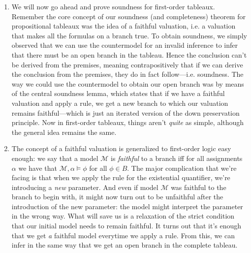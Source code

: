 	\begin{enumerate}[{\thesection}.1]

		\item We will now go ahead and prove soundness for
                  first-order tableaux. Remember the core
                  concept of our soundness (and completeness) theorem
                  for propositional tableaux was the idea of a
                  faithful valuation, i.e. a valuation that makes all
                  the formulas on a branch true. To obtain soundness,
                  we simply observed that we can use the countermodel
                  for an invalid inference to infer that there must be
                  an open branch in the tableau. Hence the conclusion
                  can't be derived from the premises, meaning
                  contrapositively that if we can derive the
                  conclusion from the premises, they do in fact
                  follow---i.e. soundness. The way we could use the
                  countermodel to obtain our open branch was by means
                  of the central soundness lemma, which states that if
                  we have a faithful valuation and apply a rule, we
                  get a new branch to which our valuation remains
                  faithful---which is just an iterated version of the
                  down preservation principle. Now in first-order
                  tableaux, things aren't \emph{quite} as simple,
                  although the general idea remains the same.

                  \item The
                  concept of a faithful valuation is generalized to
                  first-order logic easy enough: we say that a model
                  $\mathcal{M}$ is \emph{faithful} to a branch iff for all
                  assignments $\alpha$ we have that
                  $\mathcal{M},\alpha\vDash \phi$ for all $\phi\in
                  B$. The major
                  complication that we're facing is that when we apply
                  the rule for the existential quantifier, we're
                  introducing a \emph{new} parameter. And even if
                  model $\mathcal{M}$ was faithful to the branch to
                  begin with,
                  it might now turn out to be unfaithful after the
                  introduction of the new parameter: the model might
                  interpret the parameter in the wrong way.  What will
                  save us is a relaxation of the strict
                  condition that our initial model needs to remain
                  faithful. It turns out that it's enough that we get
                  \emph{a} faithful model everytime we apply a
                  rule. From this, we can infer in the same way that
                  we get an open branch in the complete tableau.


\end{enumerate}
